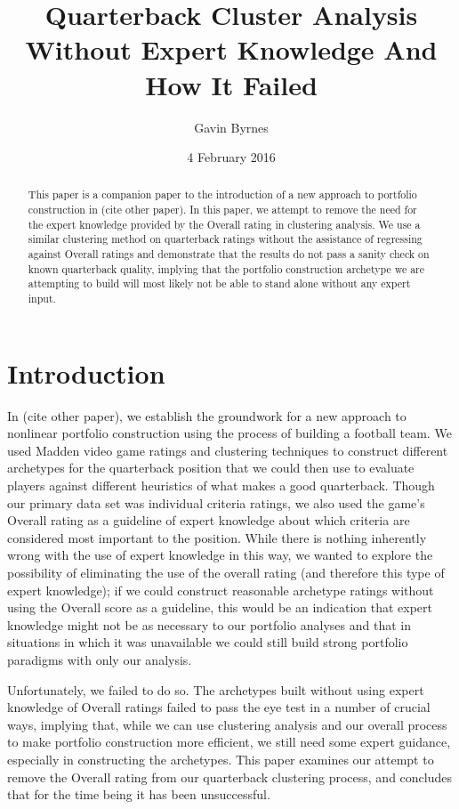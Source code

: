 \documentclass[12pt]{article}
\title{Quarterback Cluster Analysis Without Expert Knowledge And How It Failed}
\author{Gavin Byrnes}
\date{4 February 2016}
\begin{document}
\maketitle

\begin{abstract}
This paper is a companion paper to the introduction of a new approach to portfolio construction in (cite other paper). In this paper, we attempt to remove the need for the expert knowledge provided by the Overall rating in clustering analysis. We use a similar clustering method on quarterback ratings without the assistance of regressing against Overall ratings and demonstrate that the results do not pass a sanity check on known quarterback quality, implying that the portfolio construction archetype we are attempting to build will most likely not be able to stand alone without any expert input.
\end{abstract}

\section{Introduction}
In (cite other paper), we establish the groundwork for a new approach to nonlinear portfolio construction using the process of building a football team. We used Madden video game ratings and clustering techniques to construct different archetypes for the quarterback position that we could then use to evaluate players against different heuristics of what makes a good quarterback. Though our primary data set was individual criteria ratings, we also used the game's Overall rating as a guideline of expert knowledge about which criteria are considered most important to the position. While there is nothing inherently wrong with the use of expert knowledge in this way, we wanted to explore the possibility of eliminating the use of the overall rating (and therefore this type of expert knowledge); if we could construct reasonable archetype ratings without using the Overall score as a guideline, this would be an indication that expert knowledge might not be as necessary to our portfolio analyses and that in situations in which it was unavailable we could still build strong portfolio paradigms with only our analysis.

Unfortunately, we failed to do so. The archetypes built without using expert knowledge of Overall ratings failed to pass the eye test in a number of crucial ways, implying that, while we can use clustering analysis and our overall process to make portfolio construction more efficient, we still need some expert guidance, especially in constructing the archetypes. This paper examines our attempt to remove the Overall rating from our quarterback clustering process, and concludes that for the time being it has been unsuccessful.
\end{document}
